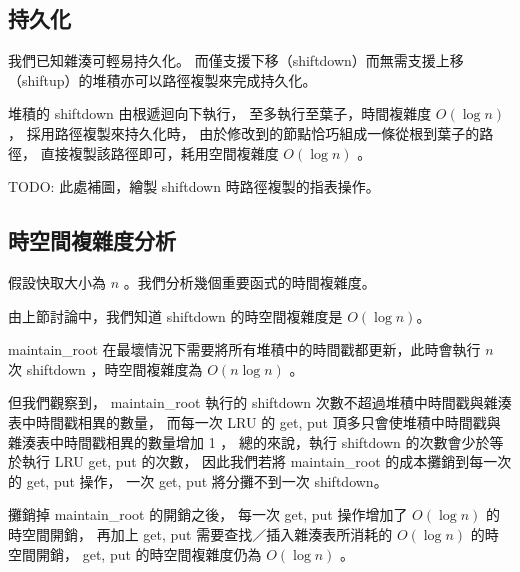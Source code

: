 \subsection{持久化}

我們已知雜湊可輕易持久化。
而僅支援下移（shiftdown）而無需支援上移（shiftup）的堆積亦可以路徑複製來完成持久化。

堆積的 shiftdown 由根遞迴向下執行，
至多執行至葉子，時間複雜度 $O(\log n)$ ，
採用路徑複製來持久化時，
由於修改到的節點恰巧組成一條從根到葉子的路徑，
直接複製該路徑即可，耗用空間複雜度 $O(\log n)$ 。

TODO: 此處補圖，繪製 shiftdown 時路徑複製的指表操作。

\subsection{時空間複雜度分析}

假設快取大小為 $n$ 。我們分析幾個重要函式的時間複雜度。

由上節討論中，我們知道 shiftdown 的時空間複雜度是 $O(\log n)$。

maintain\_root 在最壞情況下需要將所有堆積中的時間戳都更新，此時會執行 $n$ 次 shiftdown ，時空間複雜度為 $O(n \log n)$ 。

但我們觀察到，
maintain\_root 執行的 shiftdown 次數不超過堆積中時間戳與雜湊表中時間戳相異的數量，
而每一次 LRU 的 get, put 頂多只會使堆積中時間戳與雜湊表中時間戳相異的數量增加 1 ，
總的來說，執行 shiftdown 的次數會少於等於執行 LRU get, put 的次數，
因此我們若將 maintain\_root 的成本攤銷到每一次的 get, put 操作，
一次 get, put 將分攤不到一次 shiftdown。

攤銷掉 maintain\_root 的開銷之後，
每一次 get, put 操作增加了 $O(\log n)$ 的時空間開銷，
再加上 get, put 需要查找／插入雜湊表所消耗的 $O(\log n)$ 的時空間開銷，
get, put 的時空間複雜度仍為 $O(\log n)$ 。